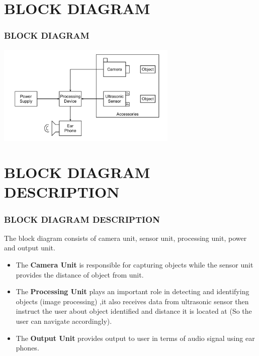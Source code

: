 \documentclass[
	11pt, %
	t, %
	aspectratio=169, %
]{beamer}
\begin{document}
\section{BLOCK DIAGRAM}
\begin{frame}
	\frametitle{BLOCK DIAGRAM}
	\centering
	\includegraphics[width=325px]{block_1.jpeg}
\end{frame}
\section{BLOCK DIAGRAM DESCRIPTION}
\begin{frame}
	\frametitle{BLOCK DIAGRAM DESCRIPTION}
	The block diagram consists of camera unit, sensor unit, processing unit, power and output unit.
		\begin{itemize}
		\item The \textbf{Camera Unit} is responsible for capturing objects while the sensor unit provides the distance of object from unit.
		\item The \textbf{Processing Unit} plays an important role in detecting and identifying objects (image processing) ,it also receives data from ultrasonic sensor then instruct the user about object identified and distance it is located at (So the user can navigate accordingly).
		\item The \textbf{Output Unit} provides output to user in terms of audio signal using ear phones.
	    \end{itemize}
\end{frame}

\end{document}

